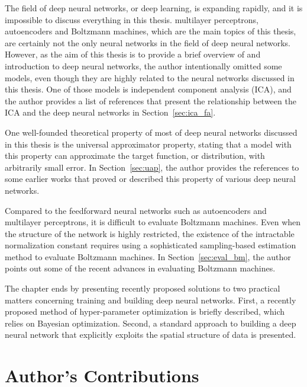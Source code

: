 \documentclass{now}
\begin{document}
The field of deep neural networks, or deep learning, is
expanding rapidly, and it is impossible to discuss
everything in this thesis. multilayer perceptrons,
autoencoders and  Boltzmann machines, which are the main topics
of this thesis, are certainly not the only neural networks
in the field of deep neural networks. However, as the aim of
this thesis is to provide a brief overview of and
introduction to deep neural networks, the author
intentionally omitted some models, even though they are
highly related to the neural networks discussed in this
thesis. One of those models is independent component
analysis (ICA), and the author provides a list of references
that present the relationship between the ICA and the deep
neural networks in Section~\ref{sec:ica_fa}.

One well-founded theoretical property of most of
deep neural networks discussed in this thesis is the
universal approximator property, stating that a model with
this property can approximate the target function, or
distribution, with arbitrarily small error. In
Section~\ref{sec:uap}, the author provides the references to
some earlier works that proved or described this property of
various deep neural networks.

Compared to the feedforward neural networks such as
autoencoders and multilayer perceptrons, it is difficult to
evaluate Boltzmann machines. Even when the structure of the
network is highly restricted, the existence of the
intractable normalization constant requires using a
sophisticated sampling-based estimation method to evaluate
Boltzmann machines. In Section~\ref{sec:eval_bm}, the author
points out some of the recent advances in evaluating
Boltzmann machines.

The chapter ends by presenting recently proposed solutions
to two practical matters concerning training and building
deep neural networks. First, a recently proposed method of
hyper-parameter optimization is briefly described, which
relies on Bayesian optimization. Second, a standard approach
to building a deep neural network that explicitly exploits
the spatial structure of data is presented.

\section{Author's Contributions}
\label{sec:contrib}
\end{document}
